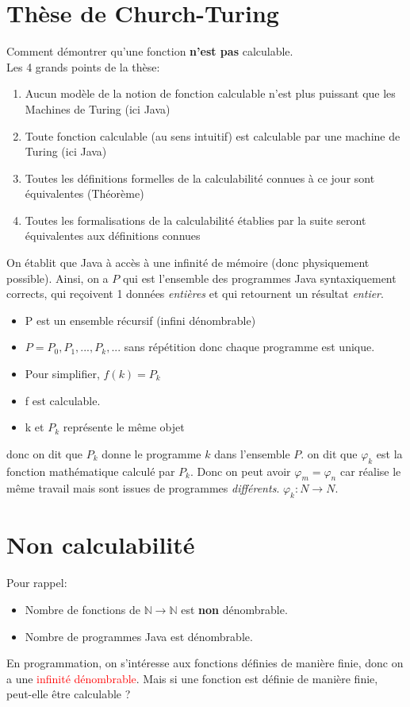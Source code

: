\documentclass{report}
\begin{document}
\section{Thèse de Church-Turing}
Comment démontrer qu'une fonction \textbf{n'est pas} calculable.\\
Les 4 grands points de la thèse:
\begin{enumerate}
\item Aucun modèle de la notion de fonction calculable n’est plus puissant que les Machines de Turing (ici Java)
\item Toute fonction calculable (au sens intuitif) est calculable par une machine de Turing (ici Java)
\item Toutes les définitions formelles de la calculabilité connues à ce jour sont équivalentes (Théorème)
\item Toutes les formalisations de la calculabilité établies par la suite seront
équivalentes aux définitions connues
\end{enumerate}
On établit que Java à accès à une infinité de mémoire (donc physiquement possible). Ainsi, on a $P$ qui est l'ensemble des programmes Java syntaxiquement corrects, qui reçoivent 1 données \textit{entières} et qui retournent un résultat \textit{entier}.
\begin{itemize}
\item P est un ensemble récursif (infini dénombrable)
\item $P = P_0, P_1, ..., P_k, ...$ sans répétition donc chaque programme est unique.
\item Pour simplifier, $f(k) = P_k$
\item f est calculable.
\item k et $P_k$ représente le même objet
\end{itemize}

donc on dit que $P_k$ donne le programme $k$ dans l'ensemble $P$. on dit que $\varphi_k$ est la fonction mathématique calculé par $P_k$. Donc on peut avoir $\varphi_m = \varphi_n$ car réalise le même travail mais sont issues de programmes \textit{différents}. $\varphi_k: N \rightarrow N$. 

\section{Non calculabilité}
Pour rappel:
\begin{itemize}
\item Nombre de fonctions de $\mathbb{N} \rightarrow \mathbb{N}$ est \textbf{non} dénombrable.
\item Nombre de programmes Java est dénombrable.
\end{itemize}
En programmation, on s'intéresse aux fonctions définies de manière finie, donc on a une \textcolor{red}{infinité dénombrable}. Mais si une fonction est définie de manière finie, peut-elle être calculable ?
\end{document}
